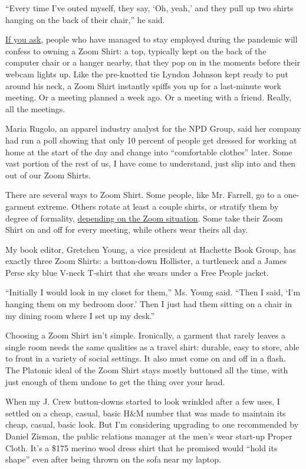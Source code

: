 ``Every time I've outed myself, they say, `Oh, yeah,' and they pull up
two shirts hanging on the back of their chair,'' he said.

\href{https://www.nytimes3xbfgragh.onion/2020/04/06/fashion/mens-fashion-work-from-home.html}{If
you ask}, people who have managed to stay employed during the pandemic
will confess to owning a Zoom Shirt: a top, typically kept on the back
of the computer chair or a hanger nearby, that they pop on in the
moments before their webcam lights up. Like the pre-knotted tie Lyndon
Johnson kept ready to put around his neck, a Zoom Shirt instantly spiffs
you up for a last-minute work meeting. Or a meeting planned a week ago.
Or a meeting with a friend. Really, all the meetings.

Maria Rugolo, an apparel industry analyst for the NPD Group, said her
company had run a poll showing that only 10 percent of people get
dressed for working at home at the start of the day and change into
``comfortable clothes'' later. Some vast portion of the rest of us, I
have come to understand, just slip into and then out of our Zoom Shirts.

There are several ways to Zoom Shirt. Some people, like Mr. Farrell, go
to a one-garment extreme. Others rotate at least a couple shirts, or
stratify them by degree of formality,
\href{https://www.nytimes3xbfgragh.onion/2020/04/15/us/coronavirus-lawyers-court-telecommute-dress-code.html}{depending
on the Zoom situation}. Some take their Zoom Shirt on and off for every
meeting, while others wear theirs all day.

My book editor, Gretchen Young, a vice president at Hachette Book Group,
has exactly three Zoom Shirts: a button-down Hollister, a turtleneck and
a James Perse sky blue V-neck T-shirt that she wears under a Free People
jacket.

``Initially I would look in my closet for them,'' Ms. Young said. ``Then
I said, `I'm hanging them on my bedroom door.' Then I just had them
sitting on a chair in my dining room where I set up my desk.''

Choosing a Zoom Shirt isn't simple. Ironically, a garment that rarely
leaves a single room needs the same qualities as a travel shirt:
durable, easy to store, able to front in a variety of social settings.
It also must come on and off in a flash. The Platonic ideal of the Zoom
Shirt stays mostly buttoned all the time, with just enough of them
undone to get the thing over your head.

When my J. Crew button-downs started to look wrinkled after a few uses,
I settled on a cheap, casual, basic H\&M number that was made to
maintain its cheap, casual, basic look. But I'm considering upgrading to
one recommended by Daniel Zisman, the public relations manager at the
men's wear start-up Proper Cloth. It's a \$175 merino wool dress shirt
that he promised would ``hold its shape'' even after being thrown on the
sofa near my laptop.

